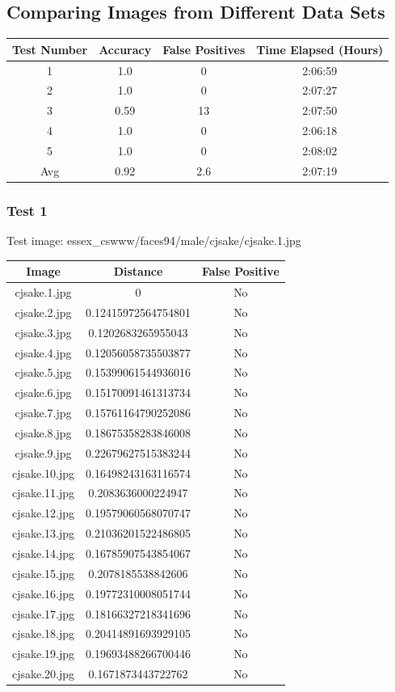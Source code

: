 \documentclass[12pt]{article}
\begin{document}
\subsection{Comparing Images from Different Data Sets}
\begin{center}
\begin{tabular}{cccc}
Test Number & Accuracy & False Positives & Time Elapsed (Hours) \\
\hline
1 & 1.0 & 0 & 2:06:59\\
2 & 1.0 & 0 & 2:07:27\\
3 & 0.59 & 13 & 2:07:50\\
4 & 1.0 & 0 & 2:06:18\\
5 & 1.0 & 0 & 2:08:02\\
Avg & 0.92 & 2.6 & 2:07:19\\
\end{tabular}
\end{center}

\subsubsection{Test 1}
Test image: essex\_cswww/faces94/male/cjsake/cjsake.1.jpg

\begin{center}
\begin{tabular}{ccc}
Image & Distance & False Positive \\
\hline
cjsake.1.jpg & 0 & No \\
cjsake.2.jpg & 0.12415972564754801 & No \\
cjsake.3.jpg & 0.1202683265955043 & No \\
cjsake.4.jpg & 0.12056058735503877 & No \\
cjsake.5.jpg & 0.15399061544936016 & No \\
cjsake.6.jpg & 0.15170091461313734 & No \\
cjsake.7.jpg & 0.15761164790252086 & No \\
cjsake.8.jpg & 0.18675358283846008 & No \\
cjsake.9.jpg & 0.22679627515383244 & No \\
cjsake.10.jpg & 0.16498243163116574 & No \\
cjsake.11.jpg & 0.2083636000224947 & No \\
cjsake.12.jpg & 0.19579060568070747 & No \\
cjsake.13.jpg & 0.21036201522486805 & No \\
cjsake.14.jpg & 0.16785907543854067 & No \\
cjsake.15.jpg & 0.2078185538842606 & No \\
cjsake.16.jpg & 0.19772310008051744 & No \\
cjsake.17.jpg & 0.18166327218341696 & No \\
cjsake.18.jpg & 0.20414891693929105 & No \\
cjsake.19.jpg & 0.19693488266700446 & No \\
cjsake.20.jpg & 0.1671873443722762 & No \\
\end{tabular}
\end{center}
\end{document}
